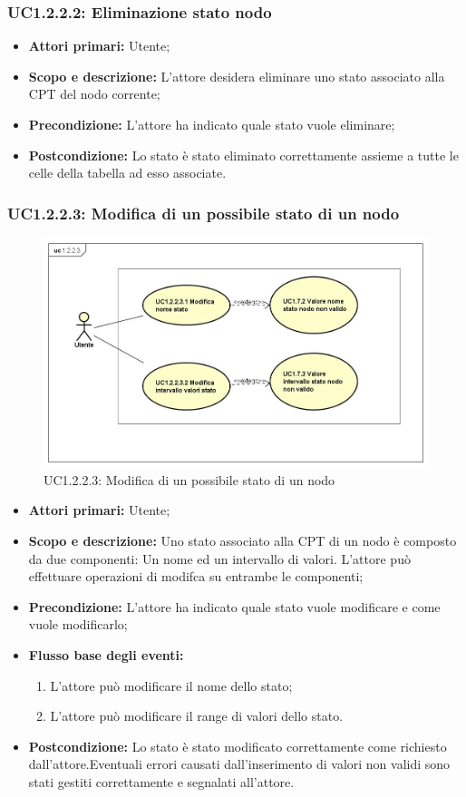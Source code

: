 \subsubsection{UC1.2.2.2: Eliminazione stato nodo} 
\begin{itemize} 
	\item{\textbf{Attori primari:} Utente;} 
	\item{\textbf{Scopo e descrizione:} L'attore desidera eliminare uno stato associato alla CPT del nodo corrente;} 
	\item{\textbf{Precondizione:} L'attore ha indicato quale stato vuole eliminare;} 
	\item{\textbf{Postcondizione:} Lo stato è stato eliminato correttamente assieme a tutte le celle della tabella ad esso associate.} 
\end{itemize} 
\subsubsection{UC1.2.2.3: Modifica di un possibile stato di un nodo} 
\begin{figure} [H]
	\centering
	\includegraphics[scale=0.45]{Img/UC1-2-2-3} 
	\caption{UC1.2.2.3: Modifica di un possibile stato di un nodo} \label{} 
\end{figure} 
\begin{itemize} 
	\item{\textbf{Attori primari:} Utente;} 
	\item{\textbf{Scopo e descrizione:} Uno stato associato alla CPT di un nodo è composto da due componenti: Un nome ed un intervallo di valori. L'attore può effettuare operazioni di modifca su entrambe le componenti;} 
	\item{\textbf{Precondizione:} L'attore ha indicato quale stato vuole modificare e come vuole modificarlo;} 
	\item{\textbf{Flusso base degli eventi:} 
		\begin{enumerate} 
			\item{L'attore può modificare il nome dello stato;} 
			\item{L'attore può modificare il range di valori dello stato.} 
		\end{enumerate} 			
	} 
	\item{\textbf{Postcondizione:} Lo stato è stato modificato correttamente come richiesto dall'attore.Eventuali errori causati dall'inserimento di valori non validi sono stati gestiti correttamente e segnalati all'attore.} 
\end{itemize} 
